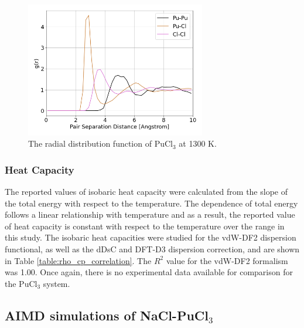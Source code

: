 \documentclass[review]{elsarticle}
\begin{document}
\begin{figure}[h!]
 \centering
 \includegraphics[width=0.7\textwidth]{rdf_pucl3_1300K.png} 
 \caption{The radial distribution function of PuCl$_3$ at 1300 K.}
 \label{fig:rdf_pucl3}
\end{figure}

\subsubsection{Heat Capacity}
The reported values of isobaric heat capacity were calculated from the slope of the total energy with respect to the temperature. The dependence of total energy follows a linear relationship with temperature and as a result, the reported value of heat capacity is constant with respect to the temperature over the range in this study. The isobaric heat capacities were studied for the vdW-DF2 dispersion functional, as well as the dDsC and DFT-D3 dispersion correction, and are shown in Table \ref{table:rho_cp_correlation}. The $R^2$ value for the vdW-DF2 formalism was 1.00. Once again, there is no experimental data available for comparison for the PuCl$_3$ system. 

\subsection{AIMD simulations of NaCl-PuCl$_3$}
\end{document}
